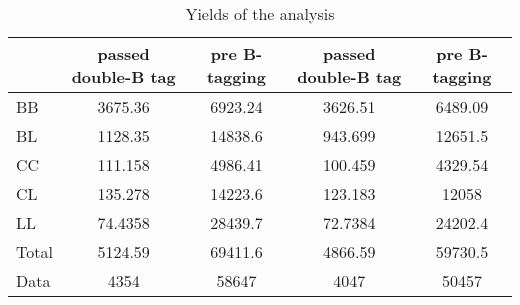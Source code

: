 \documentclass[10pt]{article}
\begin{document}
\begin{table}[htbp]
\begin{center}
\begin{tabular}{|l|S|S|S|S|}
\hline 
 & {passed double-B tag} & {pre B-tagging} & {passed double-B tag} & {pre B-tagging}\\
\hline 
  BB   & 3675.36  & 6923.24  & 3626.51  & 6489.09  \\ 
  BL   & 1128.35  & 14838.6  & 943.699  & 12651.5  \\ 
  CC   & 111.158  & 4986.41  & 100.459  & 4329.54  \\ 
  CL   & 135.278  & 14223.6  & 123.183  & 12058  \\ 
  LL   & 74.4358  & 28439.7  & 72.7384  & 24202.4  \\ 
\hline 
  Total  & 5124.59  & 69411.6  & 4866.59  & 59730.5  \\ 
\hline 
  Data   & 4354 & 58647 & 4047 & 50457 \\ 
\hline 
\end{tabular} 
\caption{Yields of the analysis} 
\end{center} 
\end{table} 
\end{document}
